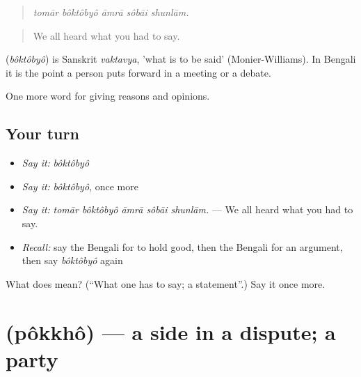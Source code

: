 \begin{quote}
    
\end{quote}

\begin{quote}
\emph{tomār bôktôbyô āmrā sôbāi shunlām.}
\end{quote}

\begin{quote}
We all heard what you had to say.
\end{quote}

\begin{cousinweb}
\textbf{} (\emph{bôktôbyô}) is Sanskrit \emph{vaktavya}, 'what is to be said' (Monier-Williams). In Bengali it is the point a person puts forward in a meeting or a debate.
\end{cousinweb}

\begin{grammarlens}[title={What you've built}]
One more word for giving reasons and opinions.
\end{grammarlens}

\subsection*{Your turn}
\begin{itemize}
\raggedright
  \item \emph{Say it:} \emph{bôktôbyô}
  \item \emph{Say it:} \emph{bôktôbyô}, once more
  \item \emph{Say it:} \emph{tomār bôktôbyô āmrā sôbāi shunlām.} — We all heard what you had to say.
  \item \emph{Recall:} say the Bengali for to hold good, then the Bengali for an argument, then say \emph{bôktôbyô} again
\end{itemize}

\begin{tcolorbox}[breakable,colback=teal!4,colframe=teal!35!black,title={Before you move on}]
What does  mean? (\textquotedblleft{}What one has to say; a statement\textquotedblright{}.) Say it once more.
\end{tcolorbox}
\section[\texorpdfstring{\bn{পক্ষ} (pôkkhô)}{পক্ষ (pôkkhô)}]{ (pôkkhô) — a side in a dispute; a party}

\label{lesson:BN-C333-pokkho}



